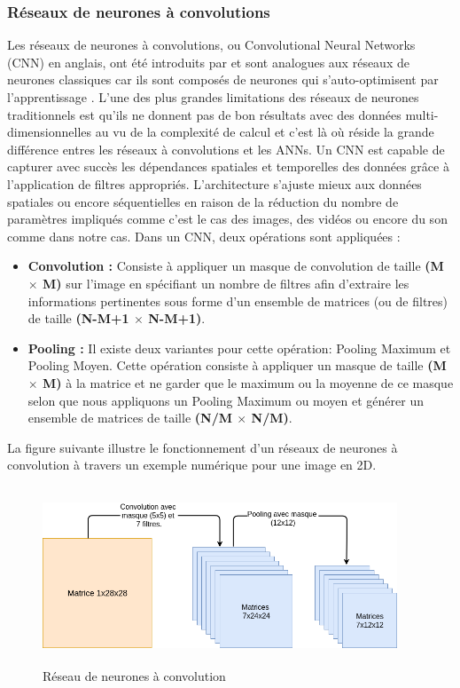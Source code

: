 \subsubsection{Réseaux de neurones à convolutions}
Les réseaux de neurones à convolutions, ou Convolutional Neural Networks (CNN) en anglais, ont été introduits par \cite{cnnhist} et sont analogues aux réseaux de neurones classiques car ils sont composés de neurones qui s'auto-optimisent par l'apprentissage \cite{cnnintro}. L'une des plus grandes limitations des réseaux de neurones traditionnels est qu'ils ne donnent pas de bon résultats avec des données multi-dimensionnelles au vu de  la complexité de calcul et c'est là où réside la grande différence entres les réseaux à convolutions et les ANNs. Un CNN est capable de capturer avec succès les dépendances spatiales et temporelles des données grâce à l'application de filtres appropriés. L'architecture s'ajuste mieux aux données spatiales ou encore séquentielles en raison de la réduction du nombre de paramètres impliqués comme c'est le cas des images, des vidéos ou encore du son comme dans notre cas. Dans un CNN, deux opérations sont appliquées : 
\begin{itemize}
    \item \textbf{Convolution :} Consiste à appliquer un masque de convolution de taille \textbf{(M $\times$ M)} sur l'image en spécifiant un nombre de filtres afin d'extraire les informations pertinentes sous forme d'un ensemble de matrices (ou de filtres) de taille \textbf{(N-M+1 $\times$ N-M+1)}.    
    \item \textbf{Pooling :} Il existe deux variantes pour cette opération: Pooling Maximum et Pooling Moyen. Cette opération consiste à appliquer un masque de taille \textbf{(M $\times$ M)} à la matrice et ne garder que le maximum ou la moyenne de ce masque selon que nous appliquons un Pooling Maximum ou moyen et générer un ensemble de matrices de taille \textbf{(N/M $\times$ N/M)}.\\
\end{itemize}

La figure suivante illustre le fonctionnement d'un réseaux de neurones à convolution à travers un exemple numérique pour une image en 2D.
\begin{figure}[H]
    \centering
    \includegraphics[height=150pt,width=300pt]{images/chap2/CNN.png}
    \caption{Réseau de neurones à convolution}
\end{figure}

